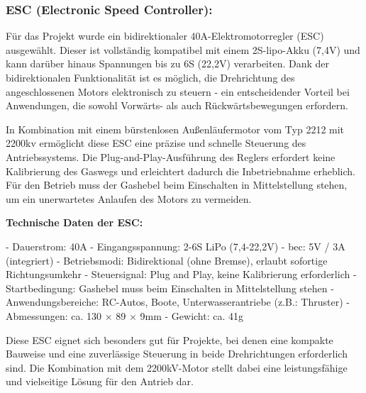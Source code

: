 \documentclass[a4paper,12pt]{article}
\begin{document}
            \newpage
            


    
        \subsubsection{ESC (Electronic Speed Controller):}
        \label{sec:ESC}


Für das Projekt wurde ein bidirektionaler 40A-Elektromotorregler (ESC) ausgewählt. Dieser ist vollständig kompatibel mit einem 2S-\gls{lipo}-Akku (7,4V) und kann darüber hinaus Spannungen bis zu 6S (22,2V) verarbeiten. Dank der bidirektionalen Funktionalität ist es möglich, die Drehrichtung des angeschlossenen Motors elektronisch zu steuern - ein entscheidender Vorteil bei Anwendungen, die sowohl Vorwärts- als auch Rückwärtsbewegungen erfordern.\newline

In Kombination mit einem bürstenlosen Außenläufermotor vom Typ 2212 mit 2200\gls{kv} ermöglicht diese ESC eine präzise und schnelle Steuerung des Antriebssystems. Die Plug-and-Play-Ausführung des Reglers erfordert keine Kalibrierung des Gaswegs und erleichtert dadurch die Inbetriebnahme erheblich. Für den Betrieb muss der Gashebel beim Einschalten in Mittelstellung stehen, um ein unerwartetes Anlaufen des Motors zu vermeiden.\newline

\textbf{Technische Daten der ESC:}
\label{sec:Technische Daten der ESC}

- Dauerstrom: 40A\newline  
- Eingangsspannung: 2-6S LiPo (7,4-22,2V)\newline 
- \gls{bec}: 5V / 3A (integriert)\newline
- Betriebsmodi: Bidirektional (ohne Bremse), erlaubt sofortige Richtungsumkehr\newline  
- Steuersignal: Plug and Play, keine Kalibrierung erforderlich\newline
- Startbedingung: Gashebel muss beim Einschalten in Mittelstellung stehen\newline  
- Anwendungsbereiche: RC-Autos, Boote, Unterwasserantriebe (z.B.: Thruster)\newline  
- Abmessungen: ca. 130 × 89 × 9mm\newline  
- Gewicht: ca. 41g  \newline

Diese ESC eignet sich besonders gut für Projekte, bei denen eine kompakte Bauweise und eine zuverlässige Steuerung in beide Drehrichtungen erforderlich sind. Die Kombination mit dem 2200kV-Motor stellt dabei eine leistungsfähige und vielseitige Lösung für den Antrieb dar.
\end{document}
